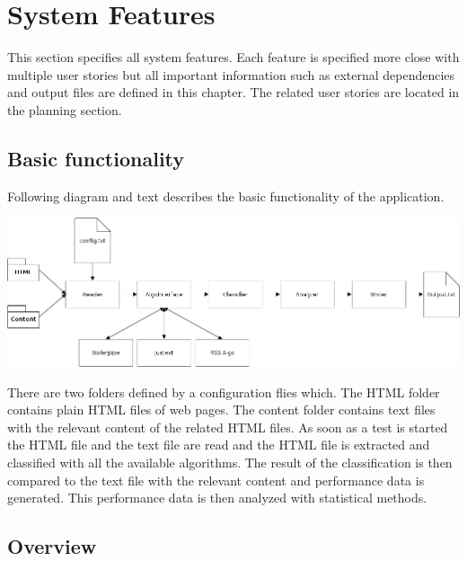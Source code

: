 \section{System Features}

This section specifies all system features. Each feature is specified more close with multiple user stories but all important information such as external dependencies and output files are defined in this chapter. The related user stories are located in the planning section.  



\begin{landscape}

\subsection{Basic functionality}
Following diagram and text describes the basic functionality of the application.

\includegraphics[width=24cm]{Pictures/Sysspec.png}

There are two folders defined by a configuration flies which. The HTML folder contains plain HTML files of web pages. The content folder contains text files with the relevant content of the related HTML files. As soon as a test is started the HTML file and the text file are read and the HTML file is extracted and classified with all the available algorithms. The result of the classification is then compared to the text file with the relevant content and performance data is generated. This performance data is then analyzed with statistical methods. 

\end{landscape}



\subsection{Overview}


